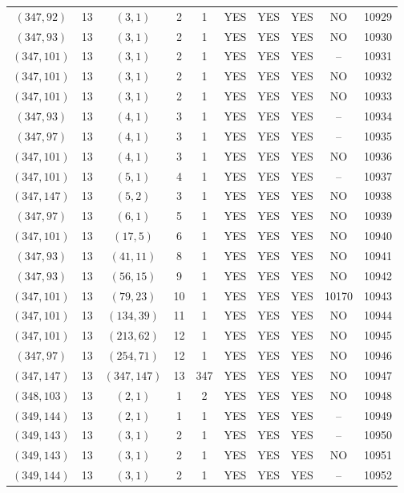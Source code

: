 \begin{longtable}{|c|c|c|c|c|c|c|c|c|c|}
$(347, 92)$ & 13 & $(3, 1)$ & 2 & 1 & YES & YES & YES & NO & 10929\\
$(347, 93)$ & 13 & $(3, 1)$ & 2 & 1 & YES & YES & YES & NO & 10930\\
$(347, 101)$ & 13 & $(3, 1)$ & 2 & 1 & YES & YES & YES & -- & 10931\\
$(347, 101)$ & 13 & $(3, 1)$ & 2 & 1 & YES & YES & YES & NO & 10932\\
$(347, 101)$ & 13 & $(3, 1)$ & 2 & 1 & YES & YES & YES & NO & 10933\\
$(347, 93)$ & 13 & $(4, 1)$ & 3 & 1 & YES & YES & YES & -- & 10934\\
$(347, 97)$ & 13 & $(4, 1)$ & 3 & 1 & YES & YES & YES & -- & 10935\\
$(347, 101)$ & 13 & $(4, 1)$ & 3 & 1 & YES & YES & YES & NO & 10936\\
$(347, 101)$ & 13 & $(5, 1)$ & 4 & 1 & YES & YES & YES & -- & 10937\\
$(347, 147)$ & 13 & $(5, 2)$ & 3 & 1 & YES & YES & YES & NO & 10938\\
$(347, 97)$ & 13 & $(6, 1)$ & 5 & 1 & YES & YES & YES & NO & 10939\\
$(347, 101)$ & 13 & $(17, 5)$ & 6 & 1 & YES & YES & YES & NO & 10940\\
$(347, 93)$ & 13 & $(41, 11)$ & 8 & 1 & YES & YES & YES & NO & 10941\\
$(347, 93)$ & 13 & $(56, 15)$ & 9 & 1 & YES & YES & YES & NO & 10942\\
$(347, 101)$ & 13 & $(79, 23)$ & 10 & 1 & YES & YES & YES & 10170 & 10943\\
$(347, 101)$ & 13 & $(134, 39)$ & 11 & 1 & YES & YES & YES & NO & 10944\\
$(347, 101)$ & 13 & $(213, 62)$ & 12 & 1 & YES & YES & YES & NO & 10945\\
$(347, 97)$ & 13 & $(254, 71)$ & 12 & 1 & YES & YES & YES & NO & 10946\\
$(347, 147)$ & 13 & $(347, 147)$ & 13 & 347 & YES & YES & YES & NO & 10947\\
$(348, 103)$ & 13 & $(2, 1)$ & 1 & 2 & YES & YES & YES & NO & 10948\\
$(349, 144)$ & 13 & $(2, 1)$ & 1 & 1 & YES & YES & YES & -- & 10949\\
$(349, 143)$ & 13 & $(3, 1)$ & 2 & 1 & YES & YES & YES & -- & 10950\\
$(349, 143)$ & 13 & $(3, 1)$ & 2 & 1 & YES & YES & YES & NO & 10951\\
$(349, 144)$ & 13 & $(3, 1)$ & 2 & 1 & YES & YES & YES & -- & 10952\\

\end{longtable}
